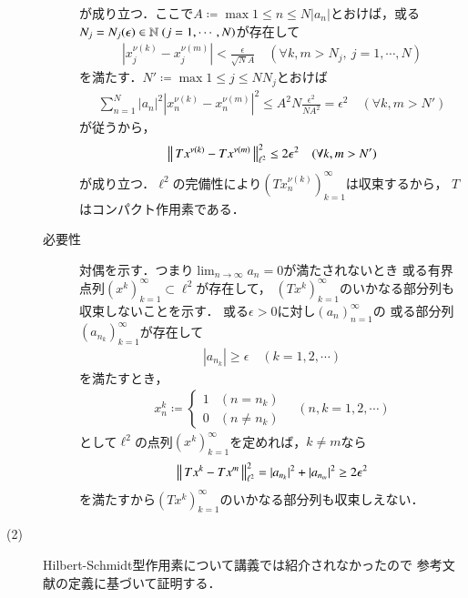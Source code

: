 \begin{prf}
\begin{description}
\begin{description}
						が成り立つ．ここで$A \coloneqq \max{1 \leq n \leq N}{|a_n|}$とおけば，或る$N_j = N_j(\epsilon) \in \N\ (j=1,\cdots,N)$が存在して
						\begin{align}
							\left|x_j^{\nu(k)} - x_j^{\nu(m)} \right| < \frac{\epsilon}{\sqrt{N} A}
							\quad (\forall k,m > N_j,\ j=1,\cdots,N)
						\end{align}
						を満たす．$N' \coloneqq \max{1 \leq j \leq N}{N_j}$とおけば
						\begin{align}
							\sum_{n=1}^{N} |a_n|^2 \left|x_n^{\nu(k)} - x_n^{\nu(m)} \right|^2
							\leq A^2 N \frac{\epsilon^2}{N A^2} = \epsilon^2
							\quad (\forall k,m > N')
						\end{align}
						が従うから，
						\begin{align}
							\left\|\, T x^{\nu(k)} - T x^{\nu(m)}\, \right\|_{\ell^2}^2 \leq 2 \epsilon^2 \quad (\forall k,m > N')
						\end{align}
						が成り立つ．$\ell^2$の完備性により$\left(T x_n^{\nu(k)} \right)_{k=1}^{\infty}$は収束するから，
						$T$はコンパクト作用素である．
						
					\item[必要性]
						対偶を示す．つまり$\lim_{n \to \infty} a_n = 0$が満たされないとき
						或る有界点列$(x^k)_{k=1}^{\infty} \subset \ell^2$が存在して，
						$(T x^k)_{k=1}^{\infty}$のいかなる部分列も収束しないことを示す．
						或る$\epsilon > 0$に対し$(a_n)_{n=1}^{\infty}$の
						或る部分列$\left(a_{n_k}\right)_{k=1}^{\infty}$が存在して
						\begin{align}
							\left| a_{n_k} \right| \geq \epsilon
							\quad (k=1,2,\cdots)
						\end{align}
						を満たすとき，
						\begin{align}
							x^k_n \coloneqq
							\begin{cases}
								1 & (n=n_k) \\
								0 & (n \neq n_k)
							\end{cases}
							\quad (n,k=1,2,\cdots)
						\end{align}
						として$\ell^2$の点列$(x^k)_{k=1}^{\infty}$を定めれば，$k \neq m$なら
						\begin{align}
							\left\|\, T x^k - T x^m\, \right\|_{\ell^2}^2
							= |a_{n_k}|^2 + |a_{n_m}|^2
							\geq 2 \epsilon^2
						\end{align}
						を満たすから$(T x^k)_{k=1}^{\infty}$のいかなる部分列も収束しえない．
				\end{description}
			\item[(2)]
				Hilbert-Schmidt型作用素について講義では紹介されなかったので
				参考文献\cite{key1}の定義に基づいて証明する．
				

\end{description}
\end{prf}
